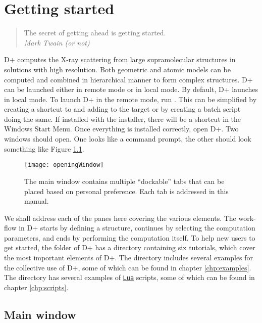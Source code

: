 \documentclass[../D+Manual.tex]{subfiles}
\begin{document}
\chapter{Getting started}
\label{sec:gettingstarted}

\begin{quote}
	The secret of getting ahead is getting started.\\
	\hspace*{\fill} \textit{Mark Twain (or not)}
\end{quote}

D+ computes the X-ray scattering from large supramolecular structures in solutions with high resolution.
Both geometric and atomic models can be computed and combined in hierarchical manner to form complex structures.
D+ can be launched either in remote mode or in local mode.
By default, D+ launches in local mode.
To launch D+ in the remote mode, run .
This can be simplified by creating a shortcut to  and adding  to the target or by creating a batch script doing the same.
If installed with the installer, there will be a  shortcut in the Windows Start Menu.
Once everything is installed correctly, open D+. Two windows should open.
One looks like a command prompt, the other should look something like Figure \ref{fig:openingWindow}.

\begin{figure}[h!]
	\centering
	\texttt{[image: openingWindow]}
	\caption[The main window]{The main window contains multiple ``dockable'' tabs that can be placed based on personal preference. Each tab is addressed in this manual.}
	\label{fig:openingWindow}
\end{figure}

We shall address each of the panes here covering the various elements. The work-flow in D+ starts by defining a structure, continues by selecting the computation parameters, and ends by performing the computation itself. To help new users to get started, the folder of D+ has a  directory containing six tutorials, which cover the most important elements of D+. The  directory includes several examples for the collective use of D+, some of which can be found in chapter \ref{chp:examples}. The  directory has several examples of \href{http://www.lua.org/}{\texttt{Lua}} scripts, some of which can be found in chapter \ref{chp:scripts}. 

\section{Main window} \label{sec:mainWindow}
\end{document}

